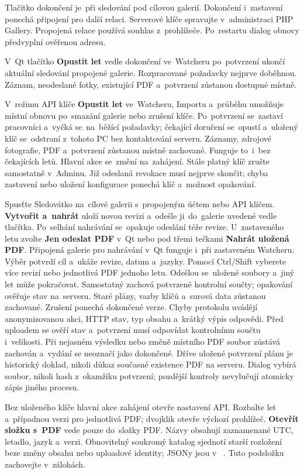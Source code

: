 \documentclass[11pt,a4paper]{article}
\newcommand{\filepath}[1]{\path{#1}}
\newcommand{\ui}[1]{\textbf{#1}}
\begin{document}
Tlačítko dokončení je~při sledování pod cílovou galerií. Dokončení
i~zastavení ponechá připojení pro další relaci. Serverové klíče spravujte
v~administraci PHP Gallery. Propojená relace používá souhlas z~prohlížeče.
Po~restartu dialog obnovy předvyplní ověřenou adresu.

V~Qt tlačítko \ui{Opustit let} vedle dokončení ve~Watcheru po~potvrzení
ukončí aktuální sledování propojené galerie. Rozpracované požadavky nejprve
doběhnou. Záznam, neodeslané fotky, existující PDF a~potvrzení zůstanou dostupné
místně.

V~režimu API klíče \ui{Opustit let} ve~Watcheru, Importu a~průběhu
umožňuje místní obnovu po~smazání galerie nebo zrušení klíče. Po~potvrzení
se~zastaví pracovníci a~vyčká se~na~běžící požadavky; čekající doručení
se~opustí a~uložený klíč se~odstraní z~tohoto PC bez kontaktování serveru.
Záznamy, zdrojové fotografie, PDF a~potvrzení zůstanou místně zachované.
Funguje to~i~bez čekajících letů. Hlavní akce se~změní na~zahájení.
Stále platný klíč zrušte samostatně v~Adminu. Již odeslaná revokace musí
nejprve skončit; chyba zastavení nebo uložení konfigurace ponechá klíč
a~možnost opakování.

Spusťte Sledovátko na~cílové galerii s~propojeným účtem nebo API klíčem.
\ui{Vytvořit a~nahrát} uloží novou revizi a~odešle ji~do~galerie uvedené
vedle tlačítka. Po~selhání nahrávání se~opakuje odeslání téže revize.
U~zastaveného letu zvolte \ui{Jen odeslat PDF} v~Qt nebo pod třemi tečkami
\ui{Nahrát uložená PDF}. Připojená galerie pro nahrávání v~Qt funguje i~při
zastaveném Watcheru. Výběr potvrdí cíl a~ukáže revize, datum a~jazyky.
Pomocí Ctrl/Shift vyberete více revizí
nebo jednotlivá PDF jednoho letu. Odešlou se~uložené soubory a~jiný let
může pokračovat. Samostatný \filepath{upload-receipts.json} zachová
potvrzené kontrolní součty; opakování ověřuje stav na~serveru. Staré plány,
vazby klíčů a~surová data zůstanou zachované. Zrušení ponechá dokončené verze.
Chyby protokolu uvádějí anonymizovanou akci, HTTP stav, typ obsahu a~krátký
výpis odpovědi.
Před uploadem se ověří stav a~potvrzení musí odpovídat kontrolnímu součtu
i~velikosti. Při nejasném výsledku nebo změně místního PDF soubor zůstává
zachován a~vydání se neoznačí jako dokončené. Dříve uložené potvrzení plánu
je historický doklad, nikoli důkaz současné existence PDF na serveru.
Dialog vybírá soubor, nikoli hash z~okamžiku potvrzení; pozdější kontroly
nevylučují atomicky zápis jiného procesu.

Bez uloženého klíče hlavní akce zahájení otevře nastavení
API. Rozbalte let a~případnou verzi pro jednotlivá PDF; dvojklik otevře
výchozí prohlížeč.
\ui{Otevřít složku s~PDF} vede pouze do~složky PDF. Názvy obsahují zaznamenané
UTC, letadlo, jazyk a~verzi. Obnovitelný soukromý katalog sjednotí starší
rozložení beze změny obsahu nebo uploadové identity; JSONy jsou v~
\filepath{reports/.metadata/}. Tuto podsložku zachovejte v~zálohách.
\end{document}
